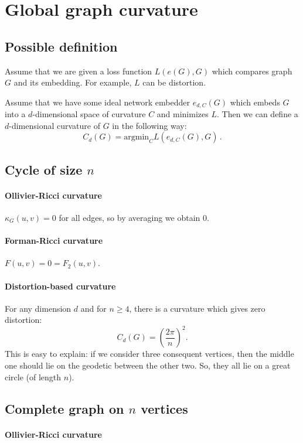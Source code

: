 \documentclass{article}
\begin{document}
\section{Global graph curvature}

\subsection{Possible definition}
        
Assume that we are given a loss function $L(e(G),G)$ which compares graph $G$ and its embedding. For example, $L$ can be distortion.

Assume that we have some ideal network embedder $e_{d,C}(G)$ which embeds $G$ into a $d$-dimensional space of curvature $C$ and minimizes $L$. Then we can define a $d$-dimensional curvature of $G$ in the following way:
\[
C_d(G) = \textrm{argmin}_C L(e_{d,C}(G),G)\,.
\]

\subsection{Cycle of size $n$}
                     
\paragraph{Ollivier-Ricci curvature} $\kappa_G(u,v) = 0$ for all edges, so by averaging we obtain $0$.

\paragraph{Forman-Ricci curvature} $F(u,v) = 0 = F_2(u,v)$.

\paragraph{Distortion-based curvature} For any dimension $d$ and for $n \ge 4$, there is a curvature which gives zero distortion:
\[
C_d(G) = \left(\frac{2\pi}{n}\right)^2.
\]
This is easy to explain: if we consider three consequent vertices, then the middle one should lie on the geodetic between the other two. So, they all lie on a great circle (of length $n$).

\subsection{Complete graph on $n$ vertices}

\paragraph{Ollivier-Ricci curvature} 
        
\end{document}
